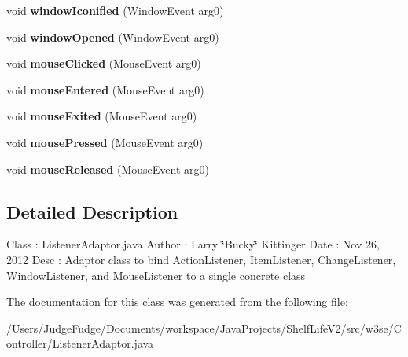 \begin{DoxyCompactItemize}
\item 
\hypertarget{classw3se_1_1_controller_1_1_listener_adaptor_ae0995af66bd85007a81930d007da8610}{void {\bfseries window\-Iconified} (Window\-Event arg0)}\label{classw3se_1_1_controller_1_1_listener_adaptor_ae0995af66bd85007a81930d007da8610}

\item 
\hypertarget{classw3se_1_1_controller_1_1_listener_adaptor_adf55f7631b831fe8f198ebf2e5bb72c5}{void {\bfseries window\-Opened} (Window\-Event arg0)}\label{classw3se_1_1_controller_1_1_listener_adaptor_adf55f7631b831fe8f198ebf2e5bb72c5}

\item 
\hypertarget{classw3se_1_1_controller_1_1_listener_adaptor_a427f55c77a13bcc0113fbf741a81ecee}{void {\bfseries mouse\-Clicked} (Mouse\-Event arg0)}\label{classw3se_1_1_controller_1_1_listener_adaptor_a427f55c77a13bcc0113fbf741a81ecee}

\item 
\hypertarget{classw3se_1_1_controller_1_1_listener_adaptor_aef13f27984efca7506534fbc0b16c3e7}{void {\bfseries mouse\-Entered} (Mouse\-Event arg0)}\label{classw3se_1_1_controller_1_1_listener_adaptor_aef13f27984efca7506534fbc0b16c3e7}

\item 
\hypertarget{classw3se_1_1_controller_1_1_listener_adaptor_a0b8137c0176b3e02cd823e3873aebc50}{void {\bfseries mouse\-Exited} (Mouse\-Event arg0)}\label{classw3se_1_1_controller_1_1_listener_adaptor_a0b8137c0176b3e02cd823e3873aebc50}

\item 
\hypertarget{classw3se_1_1_controller_1_1_listener_adaptor_a03b89c5d00a02aea613e24e5ace1159a}{void {\bfseries mouse\-Pressed} (Mouse\-Event arg0)}\label{classw3se_1_1_controller_1_1_listener_adaptor_a03b89c5d00a02aea613e24e5ace1159a}

\item 
\hypertarget{classw3se_1_1_controller_1_1_listener_adaptor_ad0ea7f3447bb0e0880149cf9d675e44a}{void {\bfseries mouse\-Released} (Mouse\-Event arg0)}\label{classw3se_1_1_controller_1_1_listener_adaptor_ad0ea7f3447bb0e0880149cf9d675e44a}

\end{DoxyCompactItemize}


\subsection{Detailed Description}
Class \-: Listener\-Adaptor.\-java Author \-: Larry \char`\"{}\-Bucky\char`\"{} Kittinger Date \-: Nov 26, 2012 Desc \-: Adaptor class to bind Action\-Listener, Item\-Listener, Change\-Listener, Window\-Listener, and Mouse\-Listener to a single concrete class 

The documentation for this class was generated from the following file\-:\begin{DoxyCompactItemize}
\item 
/\-Users/\-Judge\-Fudge/\-Documents/workspace/\-Java\-Projects/\-Shelf\-Life\-V2/src/w3se/\-Controller/Listener\-Adaptor.\-java\end{DoxyCompactItemize}
